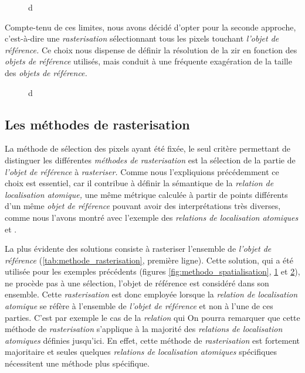 \begin{figure}
  \centering
  
  \caption{d}
  \label{fig:rasterisation_sel_pixels}
\end{figure}

Compte-tenu de ces limites, nous avons décidé d'opter pour la seconde approche, c'est-à-dire une \emph{rasterisation} sélectionnant tous les pixels touchant \emph{l'objet de référence.} Ce choix nous dispense de définir la résolution de la \ac{zir} en fonction des \emph{objets de référence} utilisés, mais conduit à une fréquente exagération de la taille des \emph{objets de référence.}

\begin{figure}
  \centering
  
  \caption{d}
  \label{fig:rasterisation_cas_limite}
\end{figure}

\subsection{Les méthodes de rasterisation}

La méthode de sélection des pixels ayant été fixée, le seul critère permettant de distinguer les différentes \emph{méthodes de rasterisation} est la sélection de la partie de \emph{l'objet de référence} à \emph{rasteriser.} Comme nous l'expliquions précédemment ce choix est essentiel, car il contribue à définir la sémantique de la \emph{relation de localisation atomique,} une même métrique calculée à partir de points différents d'un même \emph{objet de référence} pouvant avoir des interprétations très diverses, comme nous l'avons montré avec l'exemple des \emph{relations de localisation atomiques}  et .



La plus évidente des solutions consiste à rasteriser l'ensemble de \emph{l'objet de référence} (\autoref{tab:methode_rasterisation}, première ligne). Cette solution, qui a été utilisée pour les exemples précédents (\ie figures \ref{fig:methodo_spatialisation}, \ref{fig:rasterisation_sel_pixels} et \ref{fig:rasterisation_cas_limite}), ne procède pas à une sélection, l'objet de référence est considéré dans son ensemble.
%
Cette \emph{rasterisation} est donc employée lorsque la \emph{relation de localisation atomique} se réfère  à l'ensemble de \emph{l'objet de référence} et non à l'une de ces parties. C'est par exemple le cas de la \emph{relation}  qui
%
On pourra remarquer que cette méthode de \emph{rasterisation} s'applique à la majorité des \emph{relations de localisation atomiques} définies jusqu'ici. En effet, cette méthode de \emph{rasterisation} est fortement majoritaire et seules quelques \emph{relations de localisation atomiques} spécifiques nécessitent une méthode plus spécifique.

